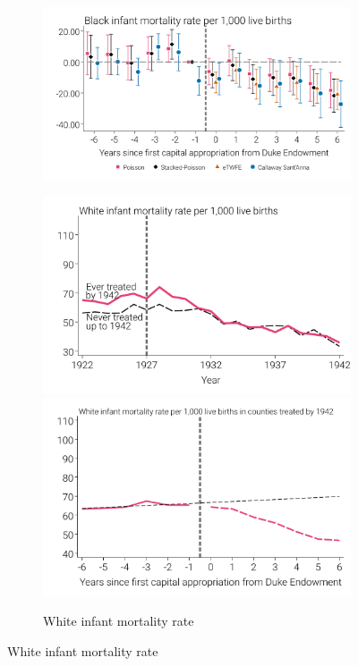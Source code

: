 \documentclass[12pt]{article}
\begin{document}
\begin{landscape}
\begin{figure}
\begin{minipage}{\linewidth}
\begin{subfigure}[b]{0.28\textwidth}
        \includegraphics[width=\linewidth]{../analysis/output/main/figure_4b3_imr_event_study_black.pdf}
    \end{subfigure}
    \hfill %
    \begin{subfigure}[b]{0.28\textwidth}
        \centering
        \caption{{White infant mortality rate}}\label{fig:imr-white}
        \includegraphics[width=\linewidth]{../analysis/output/main/figure_4c1_imr_by_treatment_status_white.pdf}
        \includegraphics[width=\linewidth]{../analysis/output/main/figure_4c2_imr_by_event_time_white.pdf}

\end{subfigure}
\end{minipage}
\end{figure}
\end{landscape}
\end{document}
